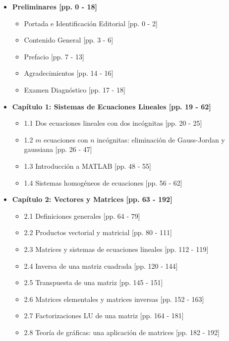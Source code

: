 \documentclass[11pt,a4paper]{article}
\begin{document}
\begin{itemize}
    \item \textbf{Preliminares [pp. 0 - 18]}
    \begin{itemize}
        \item Portada e Identificación Editorial [pp. 0 - 2]
        \item Contenido General [pp. 3 - 6]
        \item Prefacio [pp. 7 - 13]
        \item Agradecimientos [pp. 14 - 16]
        \item Examen Diagnóstico [pp. 17 - 18]
    \end{itemize}
    
    \item \textbf{Capítulo 1: Sistemas de Ecuaciones Lineales [pp. 19 - 62]}
    \begin{itemize}
        \item 1.1 Dos ecuaciones lineales con dos incógnitas [pp. 20 - 25]
        \item 1.2 $m$ ecuaciones con $n$ incógnitas: eliminación de Gauss-Jordan y gaussiana [pp. 26 - 47]
        \item 1.3 Introducción a MATLAB [pp. 48 - 55]
        \item 1.4 Sistemas homogéneos de ecuaciones [pp. 56 - 62]
    \end{itemize}

    \item \textbf{Capítulo 2: Vectores y Matrices [pp. 63 - 192]}
    \begin{itemize}
        \item 2.1 Definiciones generales [pp. 64 - 79]
        \item 2.2 Productos vectorial y matricial [pp. 80 - 111]
        \item 2.3 Matrices y sistemas de ecuaciones lineales [pp. 112 - 119]
        \item 2.4 Inversa de una matriz cuadrada [pp. 120 - 144]
        \item 2.5 Transpuesta de una matriz [pp. 145 - 151]
        \item 2.6 Matrices elementales y matrices inversas [pp. 152 - 163]
        \item 2.7 Factorizaciones LU de una matriz [pp. 164 - 181]
        \item 2.8 Teoría de gráficas: una aplicación de matrices [pp. 182 - 192]
    \end{itemize}


\end{itemize}
\end{document}
